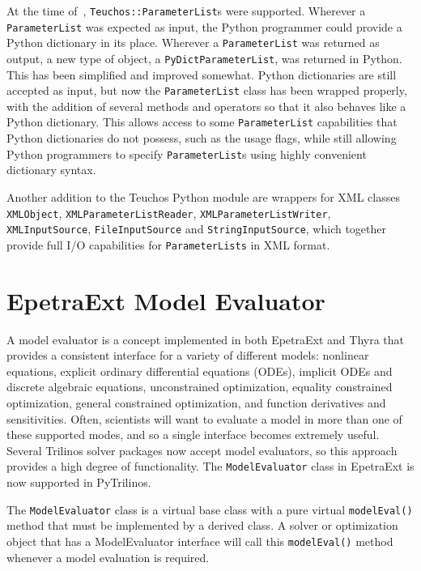 \documentclass[11pt]{article}
\begin{document}
At the time of~\cite{PyTrilinos}, {\tt Teuchos::ParameterList}s were supported.  Wherever a {\tt ParameterList} was expected as input, the Python programmer could provide a Python dictionary in its place.  Wherever a {\tt ParameterList} was returned as output, a new type of object, a {\tt PyDictParameterList}, was returned in Python.  This has been simplified and improved somewhat.  Python dictionaries are still accepted as input, but now the {\tt ParameterList} class has been wrapped properly, with the addition of several methods and operators so that it also behaves like a Python dictionary.  This allows access to some {\tt ParameterList} capabilities that Python dictionaries do not possess, such as the usage flags, while still allowing Python programmers to specify {\tt ParameterList}s using highly convenient dictionary syntax.

Another addition to the Teuchos Python module are wrappers for XML classes {\tt XMLObject}, {\tt XMLPa\-rameterListReader}, {\tt XMLParameterListWriter}, {\tt XMLInputSource}, {\tt FileInputSource} and {\tt String\-InputSource}, which together provide full I/O capabilities for {\tt ParameterLists} in XML format.

\section{EpetraExt Model Evaluator}
\label{sec:modelevaluator}

A model evaluator is a concept implemented in both EpetraExt and Thyra that provides a consistent interface for a variety of different models: nonlinear equations, explicit ordinary differential equations (ODEs), implicit ODEs and discrete algebraic equations, unconstrained optimization, equality constrained optimization, general constrained optimization, and function derivatives and sensitivities.  Often, scientists will want to evaluate a model in more than one of these supported modes, and so a single interface becomes extremely useful.  Several Trilinos solver packages now accept model evaluators, so this approach provides a high degree of functionality.  The {\tt ModelEvaluator} class in EpetraExt is now supported in PyTrilinos.

The {\tt ModelEvaluator} class is a virtual base class with a pure virtual {\tt modelEval()} method that must be implemented by a derived class.  A solver or optimization object that has a ModelEvaluator interface will call this {\tt modelEval()} method whenever a model evaluation is required.
\end{document}
